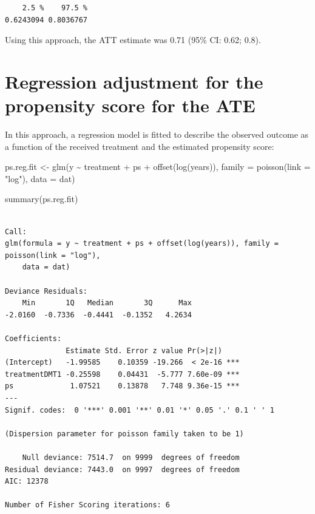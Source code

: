 \documentclass[
  letterpaper,
  DIV=11,
  numbers=noendperiod]{scrreprt}
\newenvironment{Shaded}{\begin{snugshade}}{\end{snugshade}}
\newcommand{\AttributeTok}[1]{\textcolor[rgb]{0.40,0.45,0.13}{#1}}
\newcommand{\FunctionTok}[1]{\textcolor[rgb]{0.28,0.35,0.67}{#1}}
\newcommand{\NormalTok}[1]{\textcolor[rgb]{0.00,0.23,0.31}{#1}}
\newcommand{\OtherTok}[1]{\textcolor[rgb]{0.00,0.23,0.31}{#1}}
\newcommand{\SpecialCharTok}[1]{\textcolor[rgb]{0.37,0.37,0.37}{#1}}
\newcommand{\StringTok}[1]{\textcolor[rgb]{0.13,0.47,0.30}{#1}}
\begin{document}
\begin{verbatim}
    2.5 %    97.5 % 
0.6243094 0.8036767 
\end{verbatim}

Using this approach, the ATT estimate was 0.71 (95\% CI: 0.62; 0.8).

\hypertarget{regression-adjustment-for-the-propensity-score-for-the-ate}{%
\section{Regression adjustment for the propensity score for the
ATE}\label{regression-adjustment-for-the-propensity-score-for-the-ate}}

In this approach, a regression model is fitted to describe the observed
outcome as a function of the received treatment and the estimated
propensity score:

\begin{Shaded}
\begin{Highlighting}[]
\NormalTok{ps.reg.fit }\OtherTok{\textless{}{-}} \FunctionTok{glm}\NormalTok{(y }\SpecialCharTok{\textasciitilde{}}\NormalTok{ treatment }\SpecialCharTok{+}\NormalTok{ ps }\SpecialCharTok{+} \FunctionTok{offset}\NormalTok{(}\FunctionTok{log}\NormalTok{(years)),}
                  \AttributeTok{family =} \FunctionTok{poisson}\NormalTok{(}\AttributeTok{link =} \StringTok{"log"}\NormalTok{),}
                  \AttributeTok{data =}\NormalTok{ dat)}

\FunctionTok{summary}\NormalTok{(ps.reg.fit)}
\end{Highlighting}
\end{Shaded}

\begin{verbatim}

Call:
glm(formula = y ~ treatment + ps + offset(log(years)), family = poisson(link = "log"), 
    data = dat)

Deviance Residuals: 
    Min       1Q   Median       3Q      Max  
-2.0160  -0.7336  -0.4441  -0.1352   4.2634  

Coefficients:
              Estimate Std. Error z value Pr(>|z|)    
(Intercept)   -1.99585    0.10359 -19.266  < 2e-16 ***
treatmentDMT1 -0.25598    0.04431  -5.777 7.60e-09 ***
ps             1.07521    0.13878   7.748 9.36e-15 ***
---
Signif. codes:  0 '***' 0.001 '**' 0.01 '*' 0.05 '.' 0.1 ' ' 1

(Dispersion parameter for poisson family taken to be 1)

    Null deviance: 7514.7  on 9999  degrees of freedom
Residual deviance: 7443.0  on 9997  degrees of freedom
AIC: 12378

Number of Fisher Scoring iterations: 6
\end{verbatim}
\end{document}
